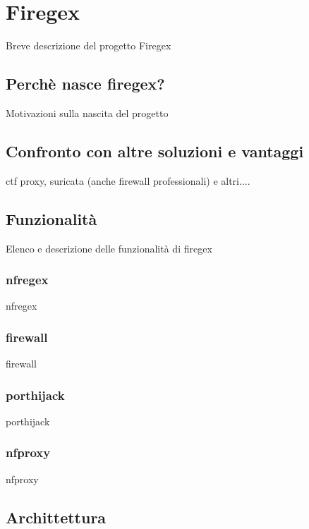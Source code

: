 \chapter{Firegex}

Breve descrizione del progetto Firegex

\section{Perchè nasce firegex?}

Motivazioni sulla nascita del progetto

\section{Confronto con altre soluzioni e vantaggi}

ctf proxy, suricata (anche firewall professionali) e altri....

\section{Funzionalità}

Elenco e descrizione delle funzionalità di firegex

\subsection{nfregex}

nfregex

\subsection{firewall}

firewall

\subsection{porthijack}

porthijack

\subsection{nfproxy}

nfproxy

\section{Archittettura}


